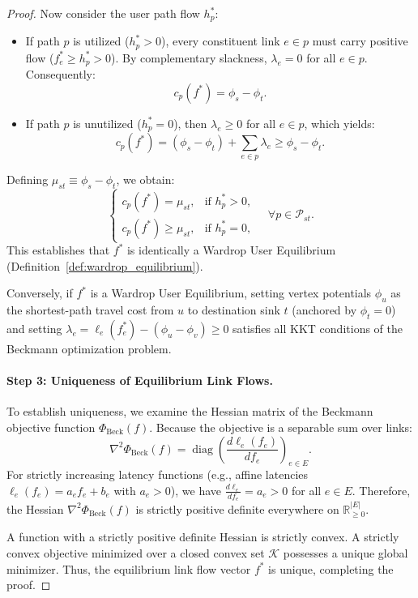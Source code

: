 \documentclass[11pt,a4paper]{article}
\begin{document}
\begin{proof}
Now consider the user path flow $h_p^*$:
\begin{itemize}
    \item If path $p$ is utilized ($h_p^* > 0$), every constituent link $e \in p$ must carry positive flow ($f_e^* \ge h_p^* > 0$). By complementary slackness, $\lambda_e = 0$ for all $e \in p$. Consequently:
    \begin{equation}
    c_p(f^*) = \phi_s - \phi_t.
    \end{equation}
    \item If path $p$ is unutilized ($h_p^* = 0$), then $\lambda_e \ge 0$ for all $e \in p$, which yields:
    \begin{equation}
    c_p(f^*) = (\phi_s - \phi_t) + \sum_{e \in p} \lambda_e \ge \phi_s - \phi_t.
    \end{equation}
\end{itemize}
Defining $\mu_{st} \equiv \phi_s - \phi_t$, we obtain:
\begin{equation}
\begin{cases}
c_p(f^*) = \mu_{st}, & \text{if } h_p^* > 0, \\
c_p(f^*) \ge \mu_{st}, & \text{if } h_p^* = 0,
\end{cases}
\quad \forall p \in \mathcal{P}_{st}.
\end{equation}
This establishes that $f^*$ is identically a Wardrop User Equilibrium (Definition~\ref{def:wardrop_equilibrium}).

Conversely, if $f^*$ is a Wardrop User Equilibrium, setting vertex potentials $\phi_u$ as the shortest-path travel cost from $u$ to destination sink $t$ (anchored by $\phi_t = 0$) and setting $\lambda_e = \ell_e(f_e^*) - (\phi_u - \phi_v) \ge 0$ satisfies all KKT conditions of the Beckmann optimization problem.

\paragraph{Step 3: Uniqueness of Equilibrium Link Flows.}
To establish uniqueness, we examine the Hessian matrix of the Beckmann objective function $\Phi_{\text{Beck}}(f)$. Because the objective is a separable sum over links:
\begin{equation}
\nabla^2 \Phi_{\text{Beck}}(f) = \operatorname{diag}\left( \frac{d \ell_e(f_e)}{d f_e} \right)_{e \in E}.
\end{equation}
For strictly increasing latency functions (e.g., affine latencies $\ell_e(f_e) = a_e f_e + b_e$ with $a_e > 0$), we have $\frac{d \ell_e}{d f_e} = a_e > 0$ for all $e \in E$. Therefore, the Hessian $\nabla^2 \Phi_{\text{Beck}}(f)$ is strictly positive definite everywhere on $\mathbb{R}^{|E|}_{\ge 0}$.

A function with a strictly positive definite Hessian is strictly convex. A strictly convex objective minimized over a closed convex set $\mathcal{K}$ possesses a unique global minimizer. Thus, the equilibrium link flow vector $f^*$ is unique, completing the proof.
\end{proof}
\end{document}
